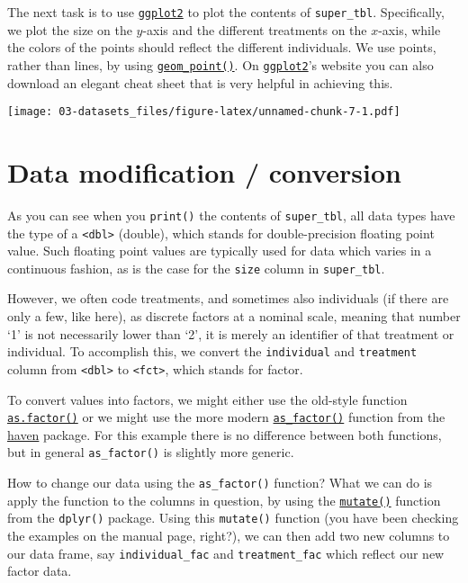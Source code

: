\documentclass[
]{book}
\begin{document}
The next task is to use \href{https://ggplot2.tidyverse.org/}{\texttt{ggplot2}} to plot the contents of \texttt{super\_tbl}. Specifically, we plot the size on the \(y\)-axis and the different treatments on the \(x\)-axis, while the colors of the points should reflect the different individuals. We use points, rather than lines, by using \href{https://ggplot2.tidyverse.org/reference/geom_point.html}{\texttt{geom\_point()}}. On \href{https://ggplot2.tidyverse.org/}{\texttt{ggplot2}}'s website you can also download an elegant cheat sheet that is very helpful in achieving this.

\texttt{[image: 03-datasets\_files/figure-latex/unnamed-chunk-7-1.pdf]}

\hypertarget{data-modification-conversion}{%
\section{Data modification / conversion}\label{data-modification-conversion}}

As you can see when you \texttt{print()} the contents of \texttt{super\_tbl}, all data types have the type of a \texttt{\textless{}dbl\textgreater{}} (double), which stands for double-precision floating point value. Such floating point values are typically used for data which varies in a continuous fashion, as is the case for the \texttt{size} column in \texttt{super\_tbl}.

However, we often code treatments, and sometimes also individuals (if there are only a few, like here), as discrete factors at a nominal scale, meaning that number `1' is not necessarily lower than `2', it is merely an identifier of that treatment or individual. To accomplish this, we convert the \texttt{individual} and \texttt{treatment} column from \texttt{\textless{}dbl\textgreater{}} to \texttt{\textless{}fct\textgreater{}}, which stands for factor.

To convert values into factors, we might either use the old-style function \href{https://stat.ethz.ch/R-manual/R-devel/library/base/html/factor.html}{\texttt{as.factor()}} or we might use the more modern \href{https://haven.tidyverse.org/reference/as_factor.html}{\texttt{as\_factor()}} function from the \href{https://haven.tidyverse.org/index.html}{haven} package. For this example there is no difference between both functions, but in general \texttt{as\_factor()} is slightly more generic.

How to change our data using the \texttt{as\_factor()} function? What we can do is apply the function to the columns in question, by using the \href{https://dplyr.tidyverse.org/reference/mutate.html}{\texttt{mutate()}} function from the \texttt{dplyr()} package. Using this \texttt{mutate()} function (you have been checking the examples on the manual page, right?), we can then add two new columns to our data frame, say \texttt{individual\_fac} and \texttt{treatment\_fac} which reflect our new factor data.
\end{document}
